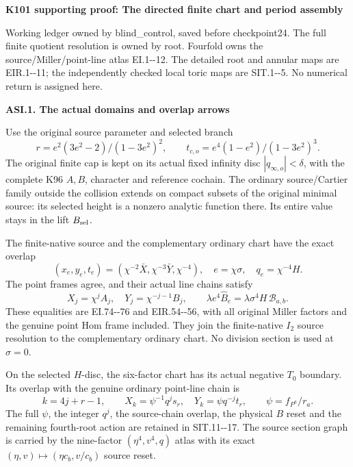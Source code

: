 \par\bigskip\noindent\textbf{K101 supporting proof: The directed finite chart and period assembly}\par\nobreak
Working ledger owned by blind\_control, saved before checkpoint24.
The full finite quotient resolution is owned by root. Fourfold owns
the source/Miller/point-line atlas EI.1-\/-12. The detailed root and
annular maps are EIR.1-\/-11; the independently checked local toric
maps are SIT.1-\/-5. No numerical return is assigned here.

\par

\medskip\noindent\textbf{ASI.1. The actual domains and overlap arrows}

\par\nobreak

Use the original source parameter and selected branch
\[
 r=e^2(3e^2-2)/(1-3e^2)^2,\qquad
 t_{c,o}=e^4(1-e^2)/(1-3e^2)^3 .
\]
The original finite cap is kept on its actual fixed infinity disc
\(|q_{\infty,o}|<\delta\), with the complete K96 \(A,B\), character
and reference cochain. The ordinary source/Cartier family outside
the collision extends on compact subsets of the original minimal
source: its selected height is a nonzero analytic function there.
Its entire value stays in the lift \(B_{\rm sel}\).

The finite-native source and the complementary ordinary chart have
the exact overlap
\[
 (x_e,y_e,t_e)=(\chi^{-2}\bar X,\chi^{-3}\bar Y,\chi^{-4}),
 \quad e=\chi\sigma,\quad q_e=\chi^{-4}H.
\]
The point frames agree, and their actual line chains satisfy
\[
 X_j=\chi^j A_j,\quad Y_j=\chi^{-j-1}B_j,\qquad
 \lambda e^4\widehat B_e
       =\lambda\sigma^4H\,\mathcal B_{a,b}.
\]
These equalities are EI.74-\/-76 and EIR.54-\/-56, with all original
Miller factors and the genuine point Hom frame included. They join
the finite-native \(I_2\) source resolution to the complementary
ordinary chart. No division section is used at \(\sigma=0\).

On the selected \(H\)-disc, the six-factor chart has its actual
negative \(T_0\) boundary. Its overlap with the genuine ordinary
point-line chain is
\[
 k=4j+r-1,\qquad
 X_k=\psi^{-1}q^j s_r,\quad Y_k=\psi q^{-j}t_r,
 \qquad \psi=f_{P^a}/r_a .
\]
The full \(\psi\), the integer \(q^j\), the source-chain overlap,
the physical \(B\) reset and the remaining fourth-root action
are retained in SIT.11-\/-17. The source section graph is carried
by the nine-factor \((\eta^4,v^4,q)\) atlas with its exact
\((\eta,v)\mapsto(\eta c_b,v/c_b)\) source reset.

